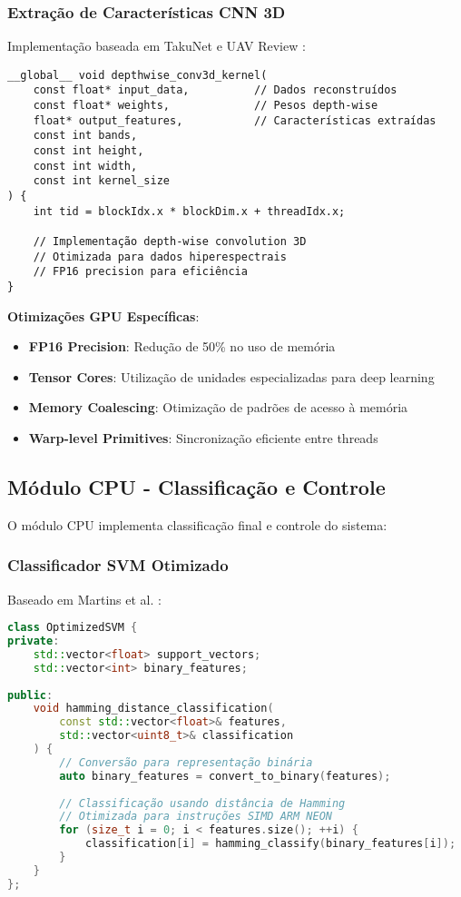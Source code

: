 \subsubsection{Extração de Características CNN 3D}

Implementação baseada em TakuNet \cite{takunet2025} e UAV Review \cite{uav_review_2024}:

\begin{lstlisting}[language=cuda, caption=CNN 3D Otimizada]
__global__ void depthwise_conv3d_kernel(
    const float* input_data,          // Dados reconstruídos
    const float* weights,             // Pesos depth-wise
    float* output_features,           // Características extraídas
    const int bands, 
    const int height, 
    const int width,
    const int kernel_size
) {
    int tid = blockIdx.x * blockDim.x + threadIdx.x;
    
    // Implementação depth-wise convolution 3D
    // Otimizada para dados hiperespectrais
    // FP16 precision para eficiência
}
\end{lstlisting}

\textbf{Otimizações GPU Específicas}:
\begin{itemize}
\item \textbf{FP16 Precision}: Redução de 50\% no uso de memória
\item \textbf{Tensor Cores}: Utilização de unidades especializadas para deep learning
\item \textbf{Memory Coalescing}: Otimização de padrões de acesso à memória
\item \textbf{Warp-level Primitives}: Sincronização eficiente entre threads
\end{itemize}

\subsection{Módulo CPU - Classificação e Controle}

O módulo CPU implementa classificação final e controle do sistema:

\subsubsection{Classificador SVM Otimizado}

Baseado em Martins et al. \cite{martins2019}:

\begin{lstlisting}[language=cpp, caption=SVM com Distância de Hamming]
class OptimizedSVM {
private:
    std::vector<float> support_vectors;
    std::vector<int> binary_features;
    
public:
    void hamming_distance_classification(
        const std::vector<float>& features,
        std::vector<uint8_t>& classification
    ) {
        // Conversão para representação binária
        auto binary_features = convert_to_binary(features);
        
        // Classificação usando distância de Hamming
        // Otimizada para instruções SIMD ARM NEON
        for (size_t i = 0; i < features.size(); ++i) {
            classification[i] = hamming_classify(binary_features[i]);
        }
    }
};
\end{lstlisting}


